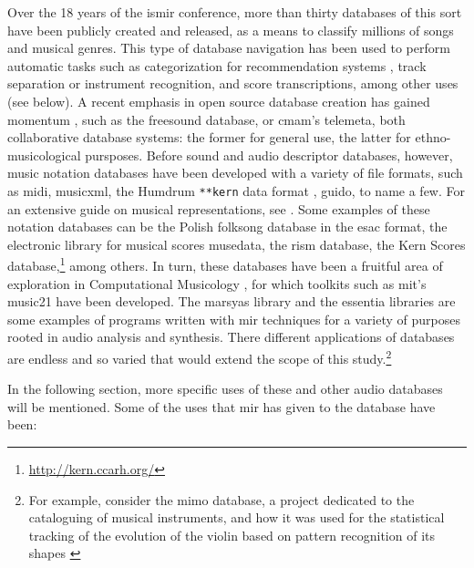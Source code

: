 Over the 18 years of the \gls{ismir} conference, more than thirty databases of this sort have been publicly created and released, as a means to classify millions of songs and musical genres. This type of database navigation has been used to perform automatic tasks such as categorization for recommendation systems \parencite{DBLP:journals/corr/abs-0812-4235}, track separation or instrument recognition, and score transcriptions, among other uses (see below). A recent emphasis in open source database creation has gained momentum \parencite{DBLP:conf/ismir/FonsecaPFFBFOPS17}, such as the \gls{freesound} database, or \gls{cmam}'s \gls{telemeta}, both collaborative database systems: the former for general use, the latter for ethno-musicological pursposes. Before sound and audio descriptor databases, however, music notation databases have been developed with a variety of file formats, such as \gls{midi}, \gls{musicxml}, the Humdrum \texttt{**kern} data format \parencite{DBLP:conf/ismir/Sapp05}, \gls{guido}, to name a few. For an extensive guide on musical representations, see \parencite{Selfridge-Field:1997:BMH:275928}. Some examples of these notation databases can be the Polish folksong database in the \gls{esac} format, the electronic library for musical scores \gls{musedata}, the \gls{rism} database, the Kern Scores database,\footnote{\url{http://kern.ccarh.org/}} among others. In turn, these databases have been a fruitful area of exploration in Computational Musicology \parencite{DBLP:conf/iciso/Yokl11}, for which toolkits such as \gls{mit}'s \gls{music21} have been developed. The \gls{marsyas} library and the \gls{essentia} libraries are some examples of programs written with \gls{mir} techniques for a variety of purposes rooted in audio analysis and synthesis. There different applications of databases are endless and so varied that would extend the scope of this study.\footnote{For example, consider the \gls{mimo} database, a project dedicated to the cataloguing of musical instruments, and how it was used for the statistical tracking of the evolution of the violin based on pattern recognition of its shapes \parencite{2018arXiv180802848P}}

In the following section, more specific uses of these and other audio databases will be mentioned. Some of the uses that \gls{mir} has given to the database have been:


